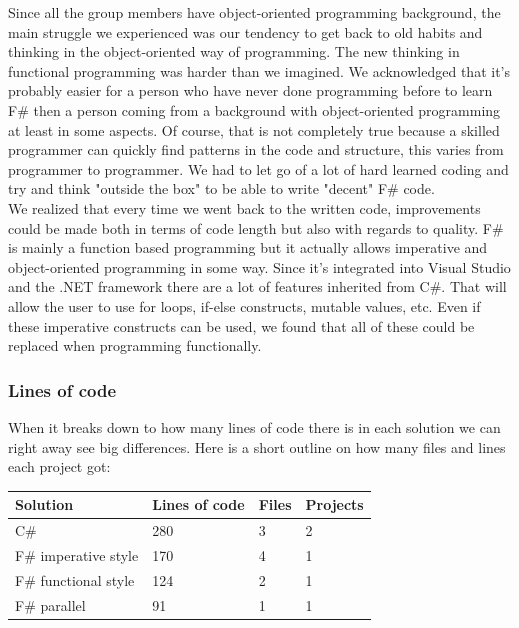 \documentclass[12pt, a4paper]{article}
\begin{document}
Since all the group members have object-oriented programming background, the main struggle we experienced was our tendency to get back to old habits and thinking in the object-oriented way of programming. The new thinking in functional programming was harder than we imagined. We acknowledged that it's probably easier for a person who have never done programming before to learn F\# then a person coming from a background with object-oriented programming at least in some aspects. Of course, that is not completely true because a skilled programmer can quickly find patterns in the code and structure, this varies from programmer to programmer. We had to let go of a lot of hard learned coding and try and think "outside the box" to be able to write "decent" F\# code.\\

We realized that every time we went back to the written code, improvements could be made both in terms of code length but also with regards to quality. F\# is mainly a function based programming but it actually allows imperative and object-oriented programming in some way. Since it's integrated into Visual Studio and the .NET framework there are a lot of features inherited from C\#. That will allow the user to use for loops, if-else constructs, mutable values, etc. Even if these imperative constructs can be used, we found that all of these could be replaced when programming functionally.\\

\newpage

\subsubsection{Lines of code}
\label{linesOfCode}
When it breaks down to how many lines of code there is in each solution we can right away see big differences. Here is a short outline on how many files and lines each project got:\\

\begin{tabular}{ |p{4cm}|p{3cm}|p{2cm}|p{3cm}|  }
 \hline
 Solution & Lines of code & Files & Projects\\
 \hline
 C\# & 280 & 3 & 2\\
 F\# imperative style & 170 & 4 & 1\\
 F\# functional style & 124 & 2 & 1\\
 F\# parallel & 91 & 1 & 1\\
 \hline
\end{tabular}\\[4mm]
\end{document}

